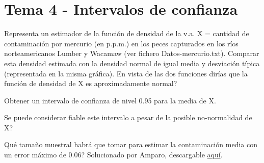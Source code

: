\newpage
\section{Tema 4 - Intervalos de confianza}

\begin{problem}[1 y 2]

\ppart Representa un estimador de la función de densidad de la v.a. X = cantidad de contaminación por mercurio (en p.p.m.) en los peces capturados en los ríos norteamericanos Lumber y Wacamaw (ver fichero Datos-mercurio.txt). Comparar esta densidad estimada con la densidad normal de igual media y desviación típica (representada en la misma gráfica). En vista de las dos funciones dirías que la función de densidad de X es aproximadamente normal?

\ppart Obtener un intervalo de confianza de nivel 0.95 para la media de X.

\ppart Se puede considerar fiable este intervalo a pesar de la posible no-normalidad de X?

\ppart Qué tamaño muestral habrá que tomar para estimar la contaminación media con un error máximo de 0.06?
\solution
Solucionado por Amparo, descargable \href{http://www.uam.es/personal_pdi/ciencias/abaillo/MatEstI/T4DatosMercurio.pdf}{aquí}.

\end{problem}

